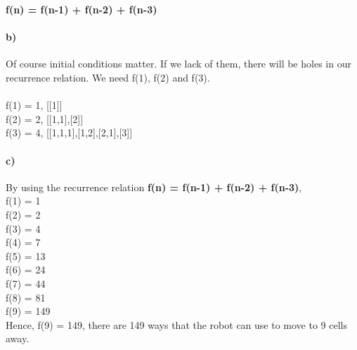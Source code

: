 \documentclass[12pt]{article}
\begin{document}
\textbf{f(n) = f(n-1) + f(n-2) + f(n-3)}

\paragraph{b)}
Of course initial conditions matter. If we lack of them, there will be holes in our recurrence relation. We need f(1), f(2) and f(3).\\\\

\noindent f(1) = 1, [[1]] \\
f(2) = 2, [[1,1],[2]] \\
f(3) = 4, [[1,1,1],[1,2],[2,1],[3]] \\
\paragraph{c)}
By using the recurrence relation \textbf{f(n) = f(n-1) + f(n-2) + f(n-3)},\\
f(1) = 1 \\
f(2) = 2 \\
f(3) = 4 \\
f(4) = 7 \\
f(5) = 13 \\
f(6) = 24 \\
f(7) = 44 \\
f(8) = 81 \\
f(9) = 149 \\
Hence, f(9) = 149, there are 149 ways that the robot can use to move to 9 cells away.
\end{document}
